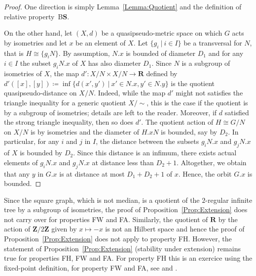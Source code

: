 \documentclass[a4paper]{article}
\newcounter{mycomment}
\newcommand{\mycomment}[2][]{\refstepcounter{mycomment}{\todo[color={green!33},size=\small]{\textbf{Commentaire [\uppercase{#1}\themycomment]:}~#2}}}
\newcommand{\PH}[1]{\todo[color={blue!33},size=small]{#1}}
\newcommand{\GS}[1]{\mycomment[GS]{#1}}
\theoremstyle{definition}
\newcommand*{\field}[1]{\mathbf{#1}}
\newcommand*{\Z}{\field{Z}}
\newcommand*{\R}{\field{R}}
\newcommand*{\BS}{B$\mathbf{S}$}
\newcommand{\setst}[2]{\{#1\ |\ #2\}}
\begin{document}
\begin{proof}
One direction is simply Lemma~\ref{Lemma:Quotient} and the definition of relative property~\BS.

On the other hand, let $(X,d)$ be a quasipseudo-metric space on which $G$ acts by isometries and let $x$ be an element of $X$.
Let $\setst{g_i}{i\in I}$ be a transversal for $N$, that is $H\cong\{g_iN\}$.
By assumption, $N.x$ is bounded of diameter $D_1$ and for any $i\in I$ the subset $g_iN.x$ of $X$ has also diameter $D_1$.
Since $N$ is a subgroup of isometries of $X$, the map $d'\colon X/N\times X/N\to\R$ defined by $d'([x],[y])\coloneqq\inf\setst{d(x',y')}{x'\in N.x,y'\in N.y}$ is the quotient quasipseudo-distance on $X/N$.
Indeed, while the map $d'$ might not satisfies the triangle inequality for a generic quotient $X/\sim$, this is the case if the quotient is by a subgroup of isometries; details are left to the reader. %
Moreover, if $d$ satisfied the strong triangle inequality, then so does $d'$.
The quotient action of $H\cong G/N$ on $X/N$ is by isometries and the diameter of $H.xN$ is bounded, say by $D_2$.
In particular, for any $i$ and $j$ in $I$, the distance between the subsets $g_iN.x$ and $g_jN.x$ of $X$ is bounded by $D_2$.
Since this distance is an infimum, there exists actual elements of $g_iN.x$ and $g_jN.x$ at distance less than $D_2+1$.
Altogether, we obtain that any $y$ in $G.x$ is at distance at most $D_1+D_2+1$ of $x$.
Hence, the orbit $G.x$ is bounded.%
\end{proof}
%
%
Since the square graph, which is not median, is a quotient of the $2$-regular infinite tree by a subgroup of isometries, the proof of Proposition~\ref{Prop:Extension} does not carry over for properties FW and FA.
Similarly, the quotient of $\R$ by the action of $\Z/2\Z$ given by $x\mapsto-x$ is not an Hilbert space and hence the proof of Proposition~\ref{Prop:Extension} does not apply to property FH.
However, the statement of Proposition~\ref{Prop:Extension} (stability under extension) remains true for properties FH, FW and FA.
For property FH this is an exercice using the fixed-point definition, for property FW and FA, see \cite{Cornulier2013} and \cite{MR0476875}.%
\end{document}
